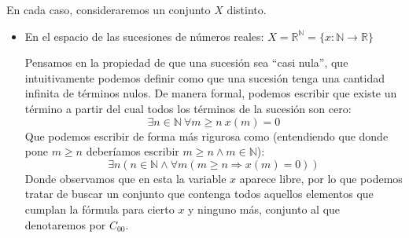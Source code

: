 \begin{ejemplo}
    En cada caso, consideraremos un conjunto $X$ distinto.
    \begin{itemize}
        \item En el espacio de las sucesiones de números reales: $X = \mathbb{R}^\mathbb{N} = \{x:\mathbb{N}\to \mathbb{R}\}$

            Pensamos en la propiedad de que una sucesión sea ``casi nula'', que intuitivamente podemos definir como que una sucesión tenga una cantidad infinita de términos nulos. De manera formal, podemos escribir que existe un término a partir del cual todos los términos de la sucesión son cero:
            \begin{equation*}
                \exists n\in \mathbb{N}\ \forall m\geq n\ x(m) = 0
            \end{equation*}
            Que podemos escribir de forma más rigurosa como (entendiendo que donde pone $m\geq n$ deberíamos escribir $m\geq n \land m\in \mathbb{N}$):
            \begin{equation*}
                \exists n(n\in \mathbb{N} \land \forall m(m\geq n \Longrightarrow x(m) = 0))
            \end{equation*}
            Donde observamos que en esta la variable $x$ aparece libre, por lo que podemos tratar de buscar un conjunto que contenga todos aquellos elementos que cumplan la fórmula para cierto $x$ y ninguno más, conjunto al que denotaremos por $C_{00}$.


\end{itemize}
\end{ejemplo}
